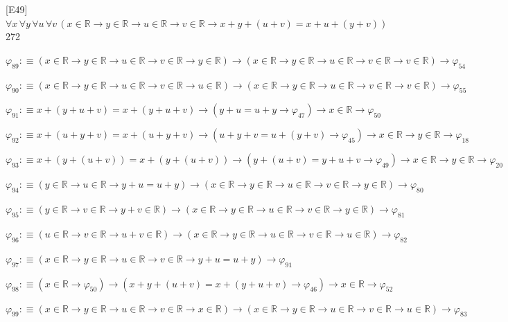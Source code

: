 \begin{fullproof}{[E49]}{$\forall x\,\forall y\,\forall u\,\forall v\,(x \in \mathbb{R} \to y \in \mathbb{R} \to u \in \mathbb{R} \to v \in \mathbb{R} \to x + y + (u + v) = x + u + (y + v))$}{272}
\begin{abbrevlist}
\item $\varphi_{89} :\equiv (x \in \mathbb{R} \to y \in \mathbb{R} \to u \in \mathbb{R} \to v \in \mathbb{R} \to y \in \mathbb{R}) \to (x \in \mathbb{R} \to y \in \mathbb{R} \to u \in \mathbb{R} \to v \in \mathbb{R} \to v \in \mathbb{R}) \to \varphi_{54}$
\item $\varphi_{90} :\equiv (x \in \mathbb{R} \to y \in \mathbb{R} \to u \in \mathbb{R} \to v \in \mathbb{R} \to u \in \mathbb{R}) \to (x \in \mathbb{R} \to y \in \mathbb{R} \to u \in \mathbb{R} \to v \in \mathbb{R} \to v \in \mathbb{R}) \to \varphi_{55}$
\item $\varphi_{91} :\equiv x + (y + u + v) = x + (y + u + v) \to (y + u = u + y \to \varphi_{47}) \to x \in \mathbb{R} \to \varphi_{50}$
\item $\varphi_{92} :\equiv x + (u + y + v) = x + (u + y + v) \to (u + y + v = u + (y + v) \to \varphi_{45}) \to x \in \mathbb{R} \to y \in \mathbb{R} \to \varphi_{18}$
\item $\varphi_{93} :\equiv x + (y + (u + v)) = x + (y + (u + v)) \to (y + (u + v) = y + u + v \to \varphi_{49}) \to x \in \mathbb{R} \to y \in \mathbb{R} \to \varphi_{20}$
\item $\varphi_{94} :\equiv (y \in \mathbb{R} \to u \in \mathbb{R} \to y + u = u + y) \to (x \in \mathbb{R} \to y \in \mathbb{R} \to u \in \mathbb{R} \to v \in \mathbb{R} \to y \in \mathbb{R}) \to \varphi_{80}$
\item $\varphi_{95} :\equiv (y \in \mathbb{R} \to v \in \mathbb{R} \to y + v \in \mathbb{R}) \to (x \in \mathbb{R} \to y \in \mathbb{R} \to u \in \mathbb{R} \to v \in \mathbb{R} \to y \in \mathbb{R}) \to \varphi_{81}$
\item $\varphi_{96} :\equiv (u \in \mathbb{R} \to v \in \mathbb{R} \to u + v \in \mathbb{R}) \to (x \in \mathbb{R} \to y \in \mathbb{R} \to u \in \mathbb{R} \to v \in \mathbb{R} \to u \in \mathbb{R}) \to \varphi_{82}$
\item $\varphi_{97} :\equiv (x \in \mathbb{R} \to y \in \mathbb{R} \to u \in \mathbb{R} \to v \in \mathbb{R} \to y + u = u + y) \to \varphi_{91}$
\item $\varphi_{98} :\equiv (x \in \mathbb{R} \to \varphi_{50}) \to (x + y + (u + v) = x + (y + u + v) \to \varphi_{46}) \to x \in \mathbb{R} \to \varphi_{52}$
\item $\varphi_{99} :\equiv (x \in \mathbb{R} \to y \in \mathbb{R} \to u \in \mathbb{R} \to v \in \mathbb{R} \to x \in \mathbb{R}) \to (x \in \mathbb{R} \to y \in \mathbb{R} \to u \in \mathbb{R} \to v \in \mathbb{R} \to u \in \mathbb{R}) \to \varphi_{83}$

\end{abbrevlist}
\end{fullproof}
